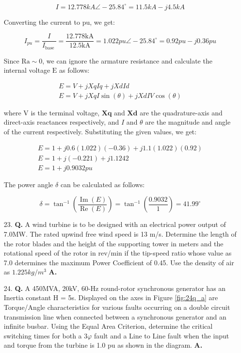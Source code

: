 \documentclass[main.tex]{subfiles}
\begin{document}
\begin{enumerate}
$$
I=12.778 k A \angle-25.84^{\circ}=11.5 k A-j 4.5 k A
$$

Converting the current to pu, we get:

$$
I_{p u}=\frac{I}{I_{\text {base }}}=\frac{12.778 \mathrm{kA}}{12.5 \mathrm{kA}}=1.022 p u \angle-25.84^{\circ}=0.92 p u-j 0.36 p u
$$

Since $\mathrm{Ra} \sim 0$, we can ignore the armature resistance and calculate the internal voltage $\mathrm{E}$ as follows:

$$
\begin{gathered}
E=V+j X q I q+j X d I d \\
E=V+j X q I \sin (\theta)+j X d I V \cos (\theta)
\end{gathered}
$$

where $\mathrm{V}$ is the terminal voltage, $\mathbf{X q}$ and $\mathbf{X d}$ are the quadrature-axis and direct-axis reactances respectively, and $I$ and $\theta$ are the magnitude and angle of the current respectively.
Substituting the given values, we get:

$$
\begin{gathered}
E=1+j 0.6(1.022)(-0.36)+j 1.1(1.022)(0.92) \\
E=1+j(-0.221)+j 1.1242 \\
E=1+j 0.9032 p u
\end{gathered}
$$

The power angle $\delta$ can be calculated as follows:

$$
\delta=\tan ^{-1}\left(\frac{\operatorname{Im}(E)}{\operatorname{Re}(E)}\right)=\tan ^{-1}\left(\frac{0.9032}{1}\right)=41.99^{\circ}
$$

\item[23.] \textbf{Q.} A wind turbine is to be designed with an electrical power output of 7.0MW. The rated upwind free wind speed is 13 m/s. Determine the length of the rotor blades and the height of the supporting tower in meters and the rotational speed of the rotor in rev/min if the tip-speed ratio whose value as 7.0 determines the maximum Power Coefficient of 0.45. Use the density of air as $\num{1.225}\unit{kg/m^3}$ \textbf{A.}

\item[24.] \textbf{Q.} A 450MVA, 20kV, 60-Hz round-rotor synchronous generator has an Inertia constant H = 5s. Displayed on the axes in Figure \ref{fig:24q_a} are Torque/Angle characteristics for various faults occurring on a double circuit transmission line when connected between a synchronous generator and an infinite busbar. Using the Equal Area Criterion, determine the critical switching times for both a $3 \varphi$ fault and a Line to Line fault when the input and torque from the turbine is 1.0 pu as shown in the diagram. \textbf{A.}


\end{enumerate}
\end{document}
